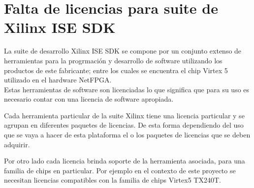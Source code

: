 



\section{Falta de licencias para suite de Xilinx ISE SDK}
\label{apendiceB3}
La suite de desarrollo Xilinx ISE SDK se compone por un conjunto extenso de herramientas para la progrmaci\'on y desarrollo de software utilizando los productos de este fabricante; entre los cuales se encuentra el chip Virtex 5 utilizado en el hardware NetFPGA.\\

Estas herramientas de software son licenciadas lo que significa que para su uso es necesario contar con una licencia de software apropiada.

Cada herramienta particular de la suite Xilinx tiene una licencia particular y se agrupan en diferentes paquetes de licencias. De esta forma dependiendo del uso que se vaya a hacer de esta plataforma el o los paquetes de licencias que se deben adquirir.

Por otro lado cada licencia brinda soporte de la herramienta asociada, para una familia de chips en particular. Por ejemplo en el contexto de este proyecto se necesitan licencias compatibles con la familia de chips Virtex5 TX240T.\\

